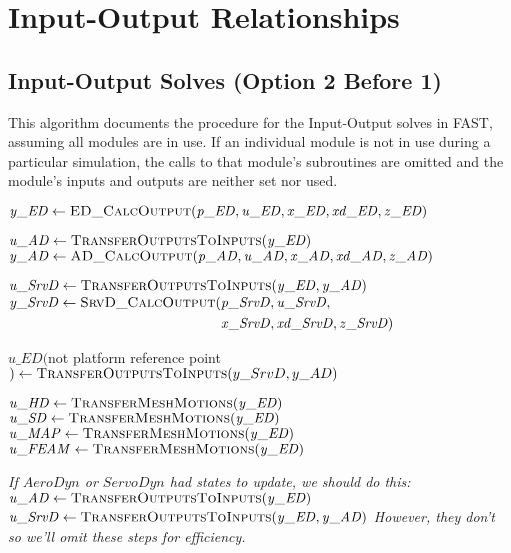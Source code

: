 \documentclass[10pt,letterpaper,oneside,notitlepage]{article}
\begin{document}
\pagebreak %
\section{Input-Output Relationships}
\subsection {Input-Output Solves (Option 2 Before 1)}
This algorithm documents the procedure for the Input-Output solves in FAST, assuming
all modules are in use. If an individual module is not in use during a particular
simulation, the calls to that module's subroutines are omitted and the module's 
inputs and outputs are neither set nor used.

\begin{algorithmic}[1]
\State $\mathit{y\_ED} \gets \Call{ED\_CalcOutput}{\mathit{p\_ED},\mathit{u\_ED},\mathit{x\_ED},\mathit{xd\_ED},\mathit{z\_ED}}$

\State
	\State $\mathit{u\_AD} \gets \Call{TransferOutputsToInputs}{\mathit{y\_ED}}$
	\State $\mathit{y\_AD} \gets \Call{AD\_CalcOutput}{\mathit{p\_AD},\mathit{u\_AD},\mathit{x\_AD},\mathit{xd\_AD},\mathit{z\_AD}}$

\State
	\State $\mathit{u\_SrvD} \gets \Call{TransferOutputsToInputs}{\mathit{y\_ED},\mathit{y\_AD}}$
	\State $\mathit{y\_SrvD} \gets \Call{SrvD\_CalcOutput}{}( \!
				\begin{aligned}[t]
				                      & \mathit{p\_SrvD},\mathit{u\_SrvD}, \\
	                            & \mathit{x\_SrvD},\mathit{xd\_SrvD},\mathit{z\_SrvD}) \\
				\end{aligned}$

\State
	\State $\mathit{u\_ED}($not platform reference point$) \gets \Call{TransferOutputsToInputs}{y\_SrvD,y\_AD}$ %

	\State $\mathit{u\_HD}   \gets \Call{TransferMeshMotions}{\mathit{y\_ED}}$
	\State $\mathit{u\_SD}   \gets \Call{TransferMeshMotions}{\mathit{y\_ED}}$
	\State $\mathit{u\_MAP}  \gets \Call{TransferMeshMotions}{\mathit{y\_ED}}$
	\State $\mathit{u\_FEAM} \gets \Call{TransferMeshMotions}{\mathit{y\_ED}}$

\State
\State {}
\State
\textit{
\State If $AeroDyn$ or $ServoDyn$ had states to update, we should do this:
\State\hspace{\algorithmicindent} $\mathit{u\_AD} \gets \Call{TransferOutputsToInputs}{\mathit{y\_ED}}$
\State\hspace{\algorithmicindent} $\mathit{u\_SrvD} \gets \Call{TransferOutputsToInputs}{\mathit{y\_ED},\mathit{y\_AD}}$
\State However, they don't so we'll omit these steps for efficiency.
}
\EndProcedure
\end{algorithmic}
\end{document}
